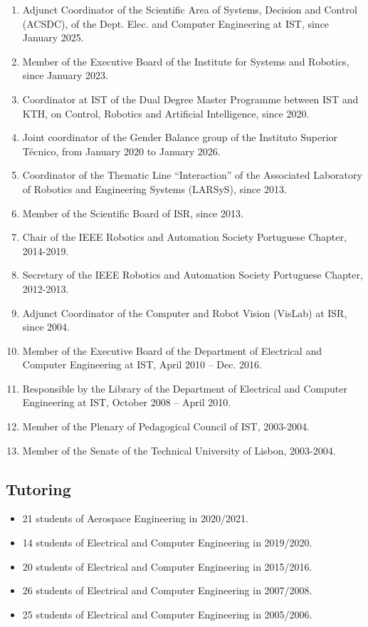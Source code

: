 \documentclass[
]{article}
\begin{document}
\begin{enumerate}
\def\labelenumi{\arabic{enumi}.}
\item
  Adjunct Coordinator of the Scientific Area of Systems, Decision and
  Control (ACSDC), of the Dept. Elec. and Computer Engineering at IST,
  since January 2025.
\item
  Member of the Executive Board of the Institute for Systems and
  Robotics, since January 2023.
\item
  Coordinator at IST of the Dual Degree Master Programme between IST and
  KTH, on Control, Robotics and Artificial Intelligence, since 2020.
\item
  Joint coordinator of the Gender Balance group of the Instituto
  Superior Técnico, from January 2020 to January 2026.
\item
  Coordinator of the Thematic Line ``Interaction'' of the Associated
  Laboratory of Robotics and Engineering Systems (LARSyS), since 2013.
\item
  Member of the Scientific Board of ISR, since 2013.
\item
  Chair of the IEEE Robotics and Automation Society Portuguese Chapter,
  2014-2019.
\item
  Secretary of the IEEE Robotics and Automation Society Portuguese
  Chapter, 2012-2013.
\item
  Adjunct Coordinator of the Computer and Robot Vision (VisLab) at ISR,
  since 2004.
\item
  Member of the Executive Board of the Department of Electrical and
  Computer Engineering at IST, April 2010 -- Dec. 2016.
\item
  Responsible by the Library of the Department of Electrical and
  Computer Engineering at IST, October 2008 -- April 2010.
\item
  Member of the Plenary of Pedagogical Council of IST, 2003-2004.
\item
  Member of the Senate of the Technical University of Lisbon, 2003-2004.
\end{enumerate}

\subsection{Tutoring}\label{tutoring-1}

\begin{itemize}
\item
  21 students of Aerospace Engineering in 2020/2021.
\item
  14 students of Electrical and Computer Engineering in 2019/2020.
\item
  20 students of Electrical and Computer Engineering in 2015/2016.
\item
  26 students of Electrical and Computer Engineering in 2007/2008.
\item
  25 students of Electrical and Computer Engineering in 2005/2006.
\end{itemize}
\end{document}
